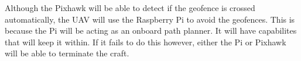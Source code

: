 Although the Pixhawk will be able to detect if the geofence is crossed automatically, the UAV will use the Raspberry Pi to avoid the geofences. This is because the Pi will be acting as an onboard path planner. It will have capabilites that will keep it within. If it fails to do this however, either the Pi or Pixhawk will be able to terminate the craft.  